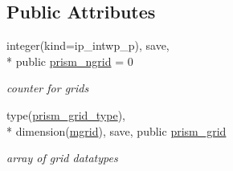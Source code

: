\subsection*{Public Attributes}
\begin{DoxyCompactItemize}
\item 
integer(kind=ip\+\_\+intwp\+\_\+p), save, \\*
public \hyperlink{classmod__oasis__grid_ad6e65eb9872825ac98db6ce1f7dcd618}{prism\+\_\+ngrid} = 0
\begin{DoxyCompactList}\small\item\em counter for grids \end{DoxyCompactList}\item 
type(\hyperlink{structmod__oasis__grid_1_1prism__grid__type}{prism\+\_\+grid\+\_\+type}), \\*
dimension(\hyperlink{classmod__oasis__grid_a9df267c5d7acbb73eb35d6aaf10ab59e}{mgrid}), save, public \hyperlink{classmod__oasis__grid_a43b75282e77fd687bd7173f4f78abcb1}{prism\+\_\+grid}
\begin{DoxyCompactList}\small\item\em array of grid datatypes \end{DoxyCompactList}\end{DoxyCompactItemize}
